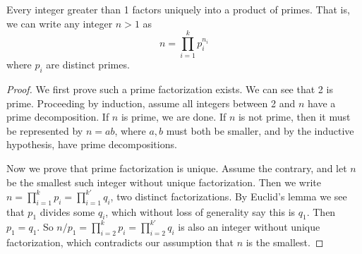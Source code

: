 \begin{theorem}
    Every integer greater than 1 factors uniquely into a product of primes.
    That is, we can write any integer \(n > 1\) as
    \begin{equation*}
        n = \prod_{i=1}^k p_i^{n_i}
    \end{equation*}
    where \(p_i\) are distinct primes.
\end{theorem}
\begin{proof}
    We first prove such a prime factorization exists.
    We can see that 2 is prime.
    Proceeding by induction, assume all integers between 2 and \(n\)
    have a prime decomposition.
    If \(n\) is prime, we are done.
    If \(n\) is not prime,
    then it must be represented by \(n = ab\),
    where \(a,b\) must both be smaller,
    and by the inductive hypothesis,
    have prime decompositions.

    Now we prove that prime factorization is unique.
    Assume the contrary,
    and let \(n\) be the smallest such integer without unique factorization.
    Then we write \(n = \prod_{i=1}^k p_i = \prod_{i=1}^{k'} q_i\),
    two distinct factorizations.
    By Euclid's lemma we see that \(p_1\) divides some \(q_i\),
    which without loss of generality say this is \(q_1\).
    Then \(p_1 = q_1\).
    So \(n/p_1 = \prod_{i=2}^k p_i = \prod_{i=2}^{k'} q_i\)
    is also an integer without unique factorization,
    which contradicts our assumption that \(n\) is the smallest.
\end{proof}
